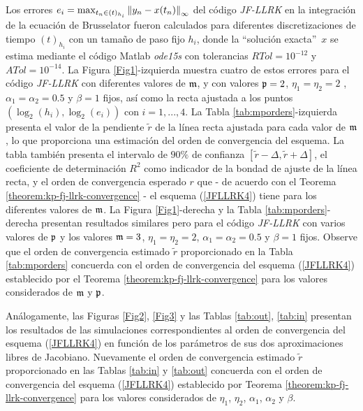 Los errores $e_i=\max_{t_n\in(t)_{h_i}}\left\lVert y_n-x(t_n) \right\rVert_\infty$ del código \textit{JF-LLRK} en la integración de la ecuación de Brusselator fueron calculados para diferentes discretizaciones de tiempo $(t)_{h_i}$ con un tamaño de paso fijo $h_i$, donde la \textquotedblleft solución exacta\textquotedblright ~$x$ se estima mediante el código Matlab \textit{ode15s} con tolerancias $RTol= 10^{-12}$ y $ATol=10^{-14}$. La Figura \ref{Fig1}-izquierda muestra cuatro de estos errores para el código \textit{JF-LLRK} con diferentes valores de $\mathfrak{m}$, y con valores $\mathfrak{p}=2$, $\eta_1=\eta_2=2$ , $\alpha_1=\alpha_2=0.5$ y $\beta=1$ fijos, así como la recta ajustada a los puntos $(\log_2(h_i),\log_2(e_i))$ con $i=1,. ..,4$. La Tabla \ref{tab:mporders}-izquierda presenta el valor de la pendiente $\widetilde{r}$ de la línea recta ajustada para cada valor de $\mathfrak{m}$, lo que proporciona una estimación del orden de convergencia del esquema. La tabla también presenta el intervalo de $90\%$ de confianza $[\widetilde{r}-\varDelta,\widetilde{r}+\varDelta]$, el coeficiente de determinación $R^2$ como indicador de la bondad de ajuste de la línea recta, y el orden de convergencia esperado $r$ que - de acuerdo con el Teorema \ref {theorem:kp-fj-llrk-convergence} - el esquema (\ref{JFLLRK4}) tiene para los diferentes valores de $\mathfrak{m}$. La Figura \ref{Fig1}-derecha y la Tabla \ref{tab:mporders}-derecha presentan resultados similares pero para el código \textit{JF-LLRK} con varios valores de $\mathfrak{p}$ y los valores $\mathfrak{m}=3$, $\eta_1=\eta_2=2$, $\alpha_1=\alpha_2=0.5$ y $\beta=1$ fijos. Observe que el orden de convergencia estimado $\widetilde{r}$ proporcionado en la Tabla \ref{tab:mporders} concuerda con el orden de convergencia del esquema (\ref{JFLLRK4}) establecido por el Teorema \ref{theorem:kp-fj-llrk-convergence} para los valores considerados de $\mathfrak{m}$ y $\mathfrak{p}$.

Análogamente, las Figuras \ref{Fig2}, \ref{Fig3} y las Tablas \ref{tab:out}, \ref{tab:in} presentan los resultados de las simulaciones correspondientes al orden de convergencia del esquema (\ref{JFLLRK4}) en función de los parámetros de sus dos aproximaciones libres de Jacobiano. Nuevamente el orden de convergencia estimado $\widetilde{r}$ proporcionado en las Tablas \ref{tab:in} y \ref{tab:out} concuerda con el orden de convergencia del esquema (\ref{JFLLRK4}) establecido por Teorema \ref{theorem:kp-fj-llrk-convergence} para los valores considerados de $\eta_1$, $\eta_2$, $\alpha_1$, $\alpha_2$ y $\beta$.

\vspace{0.4cm}

